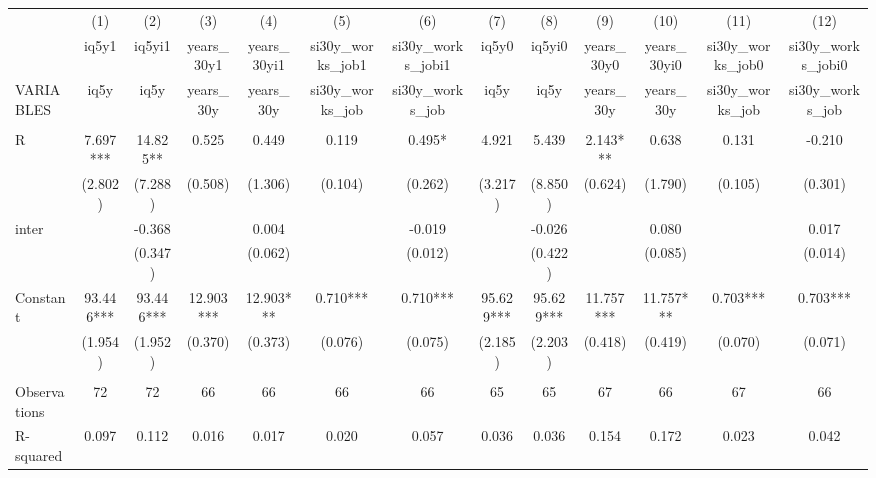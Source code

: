 \begin{tabular}{lcccccccccccc} \hline
 & (1) & (2) & (3) & (4) & (5) & (6) & (7) & (8) & (9) & (10) & (11) & (12) \\
 & iq5y1 & iq5yi1 & years\_30y1 & years\_30yi1 & si30y\_works\_job1 & si30y\_works\_jobi1 & iq5y0 & iq5yi0 & years\_30y0 & years\_30yi0 & si30y\_works\_job0 & si30y\_works\_jobi0 \\
VARIABLES & iq5y & iq5y & years\_30y & years\_30y & si30y\_works\_job & si30y\_works\_job & iq5y & iq5y & years\_30y & years\_30y & si30y\_works\_job & si30y\_works\_job \\ \hline
 &  &  &  &  &  &  &  &  &  &  &  &  \\
R & 7.697*** & 14.825** & 0.525 & 0.449 & 0.119 & 0.495* & 4.921 & 5.439 & 2.143*** & 0.638 & 0.131 & -0.210 \\
 & (2.802) & (7.288) & (0.508) & (1.306) & (0.104) & (0.262) & (3.217) & (8.850) & (0.624) & (1.790) & (0.105) & (0.301) \\
inter &  & -0.368 &  & 0.004 &  & -0.019 &  & -0.026 &  & 0.080 &  & 0.017 \\
 &  & (0.347) &  & (0.062) &  & (0.012) &  & (0.422) &  & (0.085) &  & (0.014) \\
Constant & 93.446*** & 93.446*** & 12.903*** & 12.903*** & 0.710*** & 0.710*** & 95.629*** & 95.629*** & 11.757*** & 11.757*** & 0.703*** & 0.703*** \\
 & (1.954) & (1.952) & (0.370) & (0.373) & (0.076) & (0.075) & (2.185) & (2.203) & (0.418) & (0.419) & (0.070) & (0.071) \\
 &  &  &  &  &  &  &  &  &  &  &  &  \\
Observations & 72 & 72 & 66 & 66 & 66 & 66 & 65 & 65 & 67 & 66 & 67 & 66 \\
 R-squared & 0.097 & 0.112 & 0.016 & 0.017 & 0.020 & 0.057 & 0.036 & 0.036 & 0.154 & 0.172 & 0.023 & 0.042 \\ \hline
\end{tabular}
